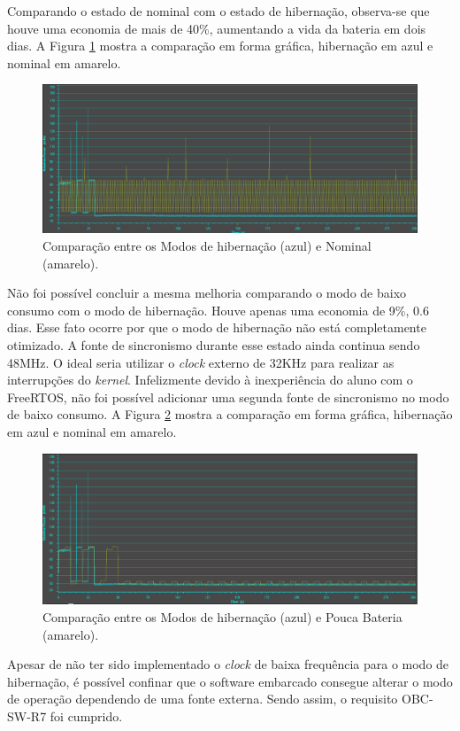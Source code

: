 Comparando o estado de nominal com o estado de hibernação, observa-se que houve uma economia de mais de 40\%, aumentando a vida da bateria em dois dias. A Figura \ref{hibernatexNormal} mostra a comparação em forma gráfica, hibernação em azul e nominal em amarelo.

\begin{figure}[h]
	\centering
	
	\includegraphics[keepaspectratio=true,scale=0.470]{figuras/hibernatexNormal.PNG}
	\caption{Comparação entre os Modos de hibernação (azul) e Nominal (amarelo).}
	\label{hibernatexNormal}
\end{figure}
\FloatBarrier

Não foi possível concluir a mesma melhoria comparando o modo de baixo consumo com o modo de hibernação. Houve apenas uma economia de 9\%, 0.6 dias. Esse fato ocorre por que o modo de hibernação não está completamente otimizado. A fonte de sincronismo durante esse estado ainda continua sendo 48MHz. O ideal seria utilizar o \textit{clock} externo de 32KHz para realizar as interrupções do \textit{kernel}. Infelizmente devido à inexperiência do aluno com o FreeRTOS, não foi possível adicionar uma segunda fonte de sincronismo no modo de baixo consumo. A Figura \ref{hibernatexLBM} mostra a comparação em forma gráfica, hibernação em azul e nominal em amarelo.

\begin{figure}[h]
	\centering
	
	\includegraphics[keepaspectratio=true,scale=0.470]{figuras/hibernatexLBM.PNG}
	\caption{Comparação entre os Modos de hibernação (azul) e Pouca Bateria (amarelo).}
	\label{hibernatexLBM}
\end{figure}
\FloatBarrier
Apesar de não ter sido implementado o \textit{clock} de baixa frequência para o modo de hibernação, é possível confinar que o software embarcado consegue alterar o modo de operação dependendo de uma fonte externa. Sendo assim, o requisito OBC-SW-R7 foi cumprido.



